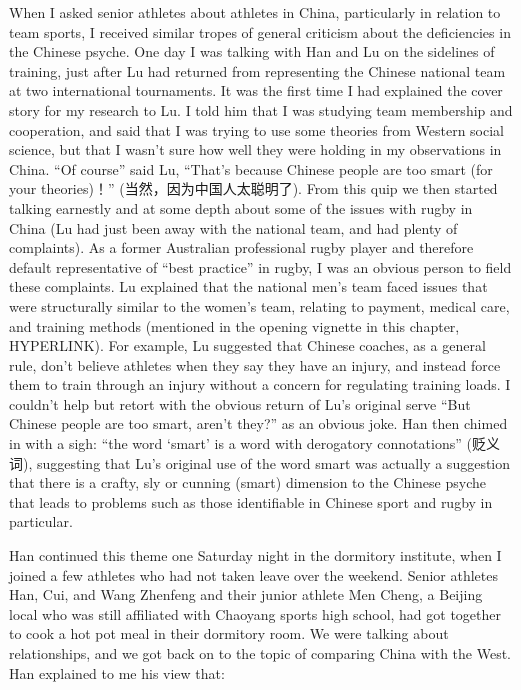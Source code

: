   When I asked senior athletes about athletes in China, particularly in relation to team sports, I received similar tropes of general  criticism about the deficiencies in the Chinese psyche.  One day I was talking with Han and Lu on the sidelines of training, just after Lu had returned from representing the Chinese national team at two international tournaments. It was the first time I had explained the cover story for my research to Lu.  I told him that I was studying team membership and cooperation, and said that I was trying to use some theories from Western social science, but that I wasn't sure how well they were holding in my observations in China. ``Of course'' said Lu, ``That's because Chinese people are too smart (for your theories)！''  (当然，因为中国人太聪明了).  From this quip we then started talking earnestly and at some depth about some of the issues with rugby in China (Lu had just been away with the national team, and had plenty of complaints).  As a former Australian professional rugby player and therefore default representative of ``best practice'' in rugby, I was an obvious person to field these complaints. Lu explained that the national men's team faced issues that were structurally similar to the women's team, relating to payment, medical care, and training methods (mentioned in the opening vignette in this chapter, HYPERLINK).  For example, Lu suggested that Chinese coaches, as a general rule, don't believe athletes when they say they have an injury, and instead force them to train through an injury without a concern for regulating training loads. I couldn't help but retort with the obvious return of Lu's original serve ``But Chinese people are too smart, aren't they?'' as an obvious joke.  Han then chimed in with a sigh: ``the word `smart' is a word with derogatory connotations'' (贬义词), suggesting that Lu's original use of the word smart was actually a suggestion that there is a crafty, sly or cunning (smart) dimension to the Chinese psyche that leads to problems such as those identifiable in Chinese sport and rugby in particular.

  Han continued this theme one Saturday night in the dormitory institute, when I joined a few athletes who had not taken leave over the weekend. Senior athletes Han, Cui, and Wang Zhenfeng and their junior athlete Men Cheng, a Beijing local who was still affiliated with Chaoyang sports high school, had got together to cook a hot pot meal in their dormitory room.  We were talking about relationships, and we got back on to the topic of comparing China with the West.  Han explained to me his view that:

